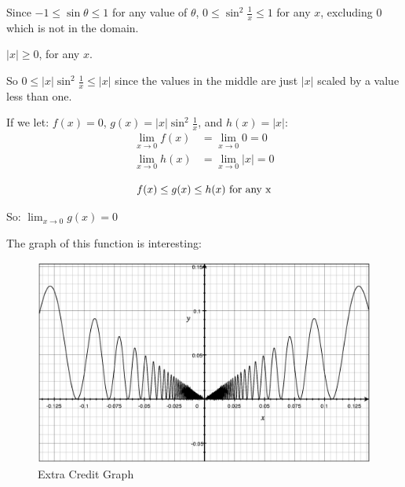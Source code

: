 \documentclass{exam}
\begin{document}
\begin{solution}

Since $-1 \leq \sin \theta \leq 1$ for any value of $\theta$, $0 \leq \sin^2 \frac{1}{x} \leq 1$ for any $x$, excluding
0 which is not in the domain.

$|x| \geq 0$, for any $x$.

So $0 \leq |x| \sin^2 \frac{1}{x} \leq |x|$ since the values in the middle are just $|x|$ scaled by a value less than one.

If we let: $f(x) = 0$, $g(x) = |x| \sin^2 \frac{1}{x}$, and $h(x) = |x|$:
\begin{align*}
  \lim_{x \to 0} f(x) &= \lim_{x \to 0} 0 = 0 \\
  \lim_{x \to 0} h(x) &=  \lim_{x \to 0} |x| = 0 \\
\end{align*}
\[
  f(x) \leq g(x) \leq h(x) \text{ for any x} \\
\]

So: $\lim_{x \to 0} g(x) = 0$

\vspace{0.2 cm}

The graph of this function is interesting:

\begin{figure}[H]
  \centering
  \includegraphics[scale=.3]{extra_credit.eps}
  \caption*{Extra Credit Graph}
\end{figure}

\end{solution}

\end{document}
